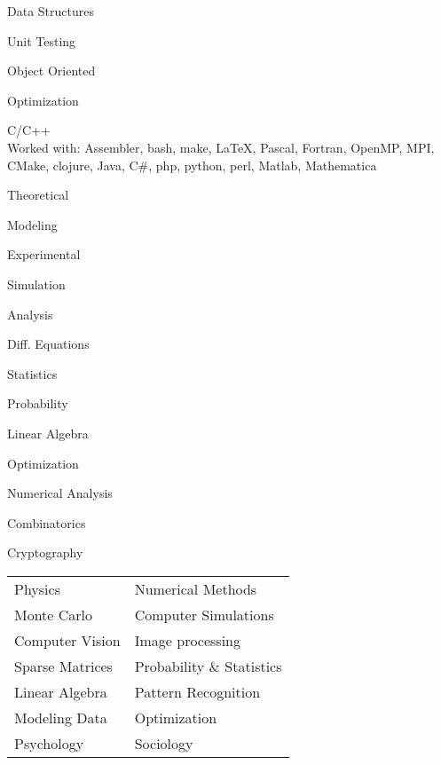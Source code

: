 {
\item Data Structures
\item Unit Testing
\item Object Oriented 
\item Optimization
}
\vspace{-0.8cm}
C/C++\\
Worked with: Assembler, bash, make, \LaTeX, Pascal, Fortran, OpenMP, MPI, CMake, clojure, Java, C\#, php, python, perl, Matlab, Mathematica
{
\item Theoretical
\item Modeling
}
{
\item Experimental
\item Simulation
}
{
\item Analysis 
\item Diff. Equations 
\item Statistics 
\item Probability 
\item Linear Algebra 
}
{
\item Optimization 
\item Numerical Analysis
\item Combinatorics
\item Cryptography
}
\begin{tabular}{ l l}
Physics             & Numerical Methods         \\
Monte Carlo         & Computer Simulations     \\ 
Computer Vision     & Image processing          \\
Sparse Matrices     & Probability \& Statistics \\
Linear Algebra      & Pattern Recognition      \\   
Modeling Data       & Optimization              \\
Psychology          & Sociology \\
\end{tabular}\\

